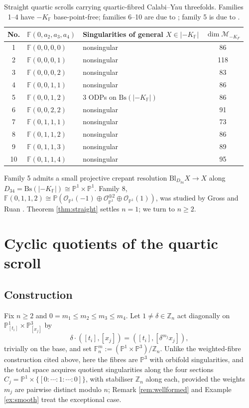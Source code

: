 \documentclass[11pt]{article}
\newcommand{\PP}{\mathbb{P}}
\newcommand{\ZZ}{\mathbb{Z}}
\newcommand{\F}{\mathbb{F}}
\begin{document}
	\begin{table}[h]
		\centering
		\begin{tabular}{c l l c}
			\hline
			No. & $\F(0,a_2,a_3,a_4)$ & Singularities of general $X\in|{-}K_{\F}|$ & $\dim\mathcal{M}_{-K_F}$ \\
			\hline
			1 & $\F(0,0,0,0)$ & nonsingular & 86 \\
			2 & $\F(0,0,0,1)$ & nonsingular & 118 \\
			3 & $\F(0,0,0,2)$ & nonsingular & 83 \\
			4 & $\F(0,0,1,1)$ & nonsingular & 86 \\
			5 & $\F(0,0,1,2)$ & 3 ODPs on $\mathrm{Bs}(|{-}K_{\F}|)$ & 86 \\
			6 & $\F(0,0,2,2)$ & nonsingular & 91 \\
			7 & $\F(0,1,1,1)$ & nonsingular & 73 \\
			8 & $\F(0,1,1,2)$ & nonsingular & 86 \\
			9 & $\F(0,1,1,3)$ & nonsingular & 89 \\
			10 & $\F(0,1,1,4)$ & nonsingular & 95 \\
			\hline
		\end{tabular}
		\caption{Straight quartic scrolls carrying quartic-fibred Calabi--Yau threefolds. Families 1--4 have $-K_{\F}$ base-point-free; families 6--10 are due to \cite{Mullet2009}; family 5 is due to \cite{MboyaSzendroi2023}.}
		\label{tab:straight}
	\end{table}
	
	Family 5 admits a small projective crepant resolution $\mathrm{Bl}_{D_{34}}X\to X$ along $D_{34}=\mathrm{Bs}(|{-}K_{\F}|)\cong\PP^1\times\PP^1$. Family 8, $\F(0,1,1,2)\cong\PP(\mathcal{O}_{\PP^1}(-1)\oplus\mathcal{O}_{\PP^1}^{\oplus 2}\oplus\mathcal{O}_{\PP^1}(1))$, was studied by Gross and Ruan \cite{Ruan1996}. Theorem \ref{thm:straight} settles $n=1$; we turn to $n\ge2$.
	
	\section{Cyclic quotients of the quartic scroll}
	
	\subsection{Construction}
	
	Fix $n\ge2$ and $0=m_1\le m_2\le m_3\le m_4$. Let $1\ne\delta\in\ZZ_n$ act diagonally on $\PP^1_{[t_i]}\times\PP^3_{[x_j]}$ by
	\[
	\delta\cdot([t_i],[x_j])=([t_i],[\delta^{m_j}x_j]),
	\]
	trivially on the base, and set $\mathbb{F}^m_n:=(\PP^1\times\PP^3)/\ZZ_n$. Unlike the weighted-fibre construction cited above, here the fibres are $\PP^3$ with orbifold singularities, and the total space acquires quotient singularities along the four sections $C_j = \PP^1 \times \{ [0 : \cdots : 1 : \cdots : 0] \}$, with stabiliser $\ZZ_n$ along each, provided the weights $m_j$ are pairwise distinct modulo $n$; Remark \ref{rem:wellformed} and Example \ref{ex:smooth} treat the exceptional case.
	
\end{document}

